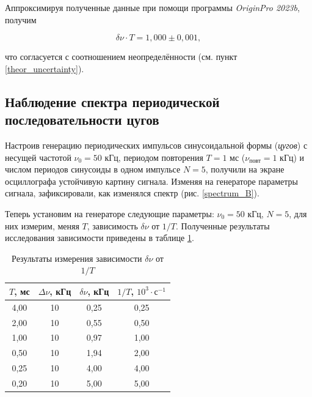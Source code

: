 \documentclass[a4paper, 12pt]{article}
\begin{document}
    Аппроксимируя полученные данные при помощи программы \textit{OriginPro 2023b}, получим

    $$
    \boxed{\delta \nu \cdot T = 1,000 \pm 0,001}, 
    $$

    что согласуется с соотношением неопределённости (см. пункт \ref{theor_uncertainty}).

    \subsection{Наблюдение спектра периодической последовательности цугов}

    Настроив генерацию периодических импульсов синусоидальной формы (\textit{цугов}) с несущей частотой $\nu_0 = 50$ кГц, периодом повторения $T = 1$ мс ($\nu_\text{повт} = 1$ кГц) и числом периодов синусоиды в одном импульсе $N = 5$, получили на экране осциллографа устойчивую картину сигнала. Изменяя на генераторе параметры сигнала, зафиксировали, как изменялся спектр (рис. \ref{spectrum_B}).

    Теперь установим на генераторе следующие параметры: $\nu_0 = 50$ кГц, $N = 5$, для них измерим, меняя $T$, зависимость $\delta \nu$ от $1/T$. Полученные результаты исследования зависимости приведены в таблице \ref{table:zug}.

    \begin{table}[H]
        \centering
        \begin{tabular}{|c|c|c|c|}
        \hline
        $T$, мс & $\Delta \nu$, кГц & $\delta \nu$, кГц & $1/T$, $10^{3} \cdot \text{с}^{-1}$ \\ \hline
        4,00 & 10 & 0,25 & 0,25 \\ \hline
        2,00 & 10 & 0,55 & 0,50 \\ \hline
        1,00 & 10 & 0,97 & 1,00 \\ \hline
        0,50 & 10 & 1,94 & 2,00 \\ \hline
        0,25 & 10 & 4,00 & 4,00 \\ \hline
        0,20 & 10 & 5,00 & 5,00 \\ \hline
        \end{tabular}
        \caption{Результаты измерения зависимости $\delta \nu$ от $1/T$}
        \label{table:zug}
    \end{table}
\end{document}
